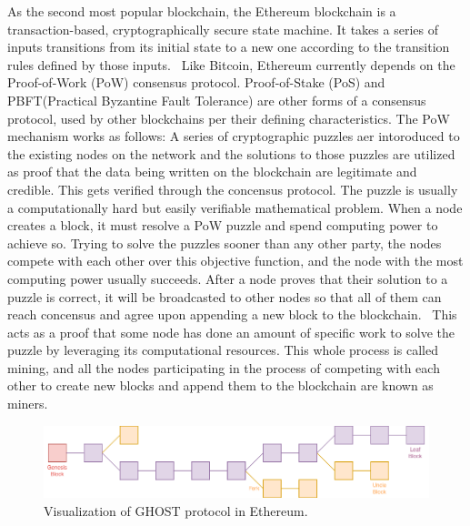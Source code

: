     As the second most popular blockchain, the Ethereum blockchain is a transaction-based, cryptographically secure state machine.
    It takes a series of inputs transitions from its initial state to a new one according to the transition rules defined by those inputs.~\cite{ferreira2022smart}
    Like Bitcoin, Ethereum currently depends on the Proof-of-Work (PoW) consensus protocol.
    Proof-of-Stake (PoS) and PBFT(Practical Byzantine Fault Tolerance) are other forms of a consensus protocol, used by other blockchains per their defining characteristics.
    The PoW mechanism works as follows:
    A series of cryptographic puzzles aer intoroduced to the existing nodes on the network and the solutions to those puzzles are utilized as proof that the data being written on the blockchain are legitimate and credible.
    This gets verified through the concensus protocol.
    The puzzle is usually a computationally hard but easily verifiable mathematical problem.
    When a node creates a block, it must resolve a PoW puzzle and spend computing power to achieve so.
    Trying to solve the puzzles sooner than any other party, the nodes compete with each other over this objective function, and the node with the most computing power usually succeeds.
    After a node proves that their solution to a puzzle is correct, it will be broadcasted to other nodes so that all of them can reach concensus and agree upon appending a new block to the blockchain.~\cite{li2020survey}
    This acts as a proof that some node has done an amount of specific work to solve the puzzle by leveraging its computational resources.
    This whole process is called mining, and all the nodes participating in the process of competing with each other to create new blocks and append them to the blockchain are known as miners.

    \begin{figure}
        \centering
        \includegraphics[width=\textwidth]{figures/uncle.png}
        \caption{Visualization of GHOST protocol in Ethereum.}
        \label{fig:uncle}
    \end{figure}

